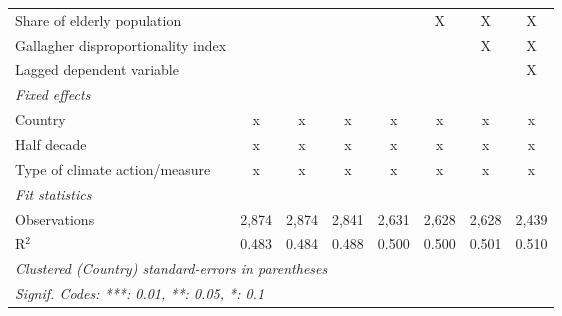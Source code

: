 \begin{tabular}{lccccccc}
   Share of elderly population                                         &               &               &               &               & X             & X             & X\\  
   Gallagher disproportionality index                                  &               &               &               &               &               & X             & X\\  
   Lagged dependent variable                                           &               &               &               &               &               &               & X\\  
   \emph{Fixed effects}\\
   Country                                                             & x             & x             & x             & x             & x             & x             & x\\  
   Half decade                                                         & x             & x             & x             & x             & x             & x             & x\\  
   Type of climate action/measure                                      & x             & x             & x             & x             & x             & x             & x\\  
   \midrule \emph{Fit statistics}\\
   Observations                                                        & 2,874         & 2,874         & 2,841         & 2,631         & 2,628         & 2,628         & 2,439\\  
   R$^2$                                                               & 0.483         & 0.484         & 0.488         & 0.500         & 0.500         & 0.501         & 0.510\\  
   \midrule
   \multicolumn{8}{l}{\emph{Clustered (Country) standard-errors in parentheses}}\\
   \multicolumn{8}{l}{\emph{Signif. Codes: ***: 0.01, **: 0.05, *: 0.1}}\\
\end{tabular}
\par\endgroup


